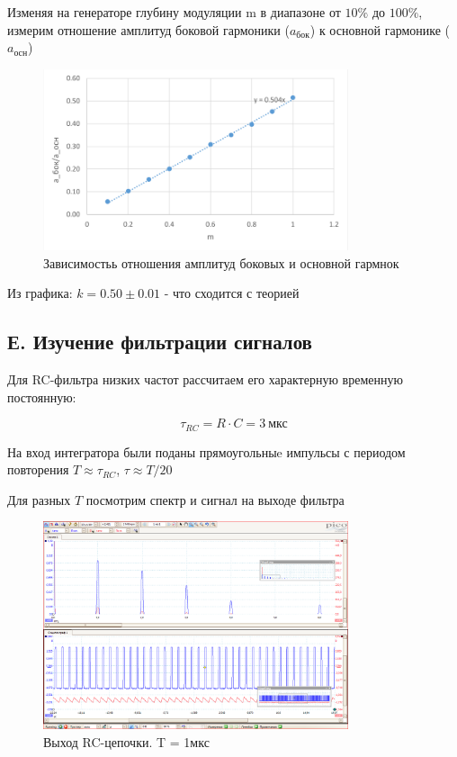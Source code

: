 \documentclass[a4paper]{article}
\begin{document}
Изменяя на генераторе глубину модуляции m в диапазоне от $10\%$ до
$100\%$, измерим отношение амплитуд боковой гармоники ($a_\text{бок}$) к основной гармонике ($a_\text{осн}$)

\begin{figure}[h!]
\centering
\includegraphics[width=0.8\textwidth]{aboba.png}
\caption{Зависимостьь отношения амплитуд боковых и основной гармнок}
\end{figure}

Из графика: $k = 0.50 \pm 0.01$ - что сходится с теорией

\clearpage
\newpage

\subsection*{Е. Изучение фильтрации сигналов}

Для RC-фильтра низких частот рассчитаем его характерную временную постоянную:

\begin{equation}
    \tau_{RC} = R \cdot C = 3 ~ \text{мкс}
\end{equation}

На вход интегратора были поданы прямоугольныe импульсы с периодом повторения $T \approx \tau_{RC}$, 
$\tau \approx T / 20$

Для разных $T$ посмотрим спектр и сигнал на выходе фильтра

\begin{figure}[h!]
\centering
\includegraphics[width=0.8\textwidth]{Интегратор tau=200нс T=1мкс.PNG}
\caption{Выход RC-цепочки. T = 1мкс}
\end{figure}
\end{document}
